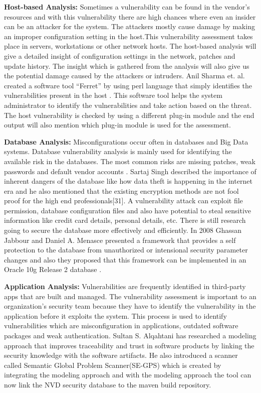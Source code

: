 {\bf Host-based Analysis:} Sometimes a vulnerability can be found in the vendor's resources and with this vulnerability there are high chances where even an insider can be an attacker for the system. The attackers mostly cause damage by making an improper configuration setting in the host.This vulnerability assessment takes place in servers, workstations or other network hosts. The host-based analysis will give a detailed insight of configuration settings in the network, patches and update history. The insight which is gathered from the analysis will also give us the potential damage caused by the attackers or intruders. Anil Sharma et. al. created a software tool “Ferret” by using perl language that simply identifies the vulnerabilities present in the host \cite{CuAnSaMaSh2004}. This software tool helps the system administrator to identify the vulnerabilities and take action based on the threat. The host vulnerability is checked by using a different plug-in module and the end output will also mention which plug-in module is used for the assessment.

{\bf Database Analysis:} Misconfigurations occur often in databases and Big Data systems. Database vulnerability analysis is mainly used for identifying the available risk in the databases. The most common risks are missing patches, weak passwords and default vendor accounts \cite{Im2021}. Sartaj Singh described the importance of inherent dangers of the database like how data theft is happening in the internet era and he also mentioned that the existing encryption methods are not fool proof for the high end professionals[31]. A vulnerability attack can exploit file permission, database configuration files and also have potential to steal sensitive information like credit card details, personal details, etc. There is still research going to secure the database more effectively and efficiently. In 2008 Ghassan Jabbour and Daniel A. Menasce presented a framework that provides a self protection to the database from unauthorized or intensional security parameter changes and also they proposed that this framework can be implemented in an Oracle 10g Release 2 database \cite{JaMe2008}.

{\bf Application Analysis:} Vulnerabilities are frequently identified in third-party apps that are built and managed. The vulnerability assessment is important to an organization’s security team because they have to identify the vulnerability in the application before it exploits the system. This process is used to identify vulnerabilities which are misconfiguration in applications, outdated software packages and weak authentication. Sultan S. Alqahtani \cite{Al2017} has researched a modeling approach that improves traceability and trust in software products by linking the security knowledge with the software artifacts. He also introduced a scanner called  Semantic Global Problem Scanner(SE-GPS) which is created by integrating the modeling approach and with the modeling approach the tool can now link the \acs{NVD} \cite{nist} security database to the maven build repository. 
